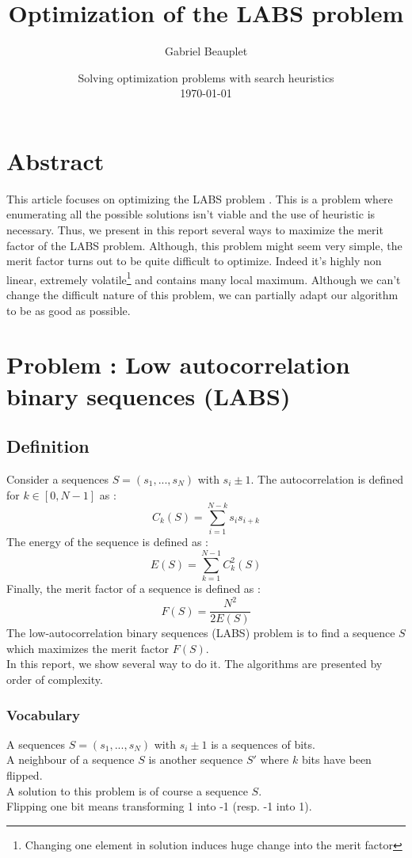 \documentclass[a4paper,11pt,openany]{article}
\title{Optimization of the LABS problem}
\author{Gabriel Beauplet}
\date{%
    Solving optimization problems with search heuristics\\%
    \today
}
\begin{document}
\maketitle
\lstset{language=Python}
\section*{Abstract}
\noindent
This article focuses on optimizing the LABS problem \cite{labs1,labs2}. This is a problem where enumerating all the possible solutions isn't viable and the use of heuristic is necessary. Thus, we present in this report several ways to maximize the merit factor of the LABS problem. Although, this problem might seem very simple, the merit factor turns out to be quite difficult to optimize. Indeed it's highly non linear, extremely volatile\footnote{Changing one element in solution induces huge change into the merit factor} and contains many local maximum. Although we can't change the difficult nature of this problem, we can partially adapt our algorithm to be as good as possible.
\section{Problem : Low autocorrelation binary sequences (LABS)}
\subsection{Definition}
\noindent
Consider a sequences $S=(s_1,...,s_N)$ with $s_i\pm 1$. The autocorrelation is defined for $k \in [0,N-1]$ as :
\begin{equation}
C_k(S)=\sum_{i=1}^{N-k} s_is_{i+k}
\end{equation}
The energy of the sequence is defined as :
\begin{equation}
\label{eq:energy}
E(S)=\sum_{k=1}^{N-1} C_k^2(S)
\end{equation}
Finally, the merit factor of a sequence is defined as :
\begin{equation}
F(S)=\frac{N^2}{2E(S)}
\end{equation}
The low-autocorrelation binary sequences (LABS) problem is to find a sequence $S$ which maximizes the merit factor $F(S)$.\\
In this report, we show several way to do it. The algorithms are presented by order of complexity.
\subsubsection{Vocabulary}
\noindent
A sequences $S=(s_1,...,s_N)$ with $s_i\pm 1$ is a sequences of bits.\\
A neighbour of a sequence $S$ is another sequence $S'$ where $k$ bits have been flipped.\\
A solution to this problem is of course a sequence $S$.\\
Flipping one bit means transforming 1 into -1 (resp. -1 into 1).
\end{document}
